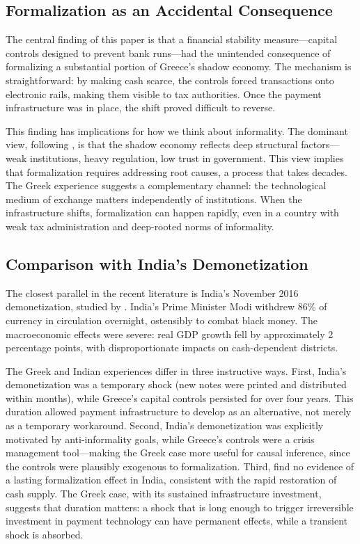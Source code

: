 \documentclass[12pt]{article}
\begin{document}
\subsection{Formalization as an Accidental Consequence}

The central finding of this paper is that a financial stability measure---capital controls designed to prevent bank runs---had the unintended consequence of formalizing a substantial portion of Greece's shadow economy. The mechanism is straightforward: by making cash scarce, the controls forced transactions onto electronic rails, making them visible to tax authorities. Once the payment infrastructure was in place, the shift proved difficult to reverse.

This finding has implications for how we think about informality. The dominant view, following \citet{laporta2014informality}, is that the shadow economy reflects deep structural factors---weak institutions, heavy regulation, low trust in government. This view implies that formalization requires addressing root causes, a process that takes decades. The Greek experience suggests a complementary channel: the technological medium of exchange matters independently of institutions. When the infrastructure shifts, formalization can happen rapidly, even in a country with weak tax administration and deep-rooted norms of informality.

\subsection{Comparison with India's Demonetization}

The closest parallel in the recent literature is India's November 2016 demonetization, studied by \citet{chodorowreich2019cash}. India's Prime Minister Modi withdrew 86\% of currency in circulation overnight, ostensibly to combat black money. The macroeconomic effects were severe: real GDP growth fell by approximately 2 percentage points, with disproportionate impacts on cash-dependent districts.

The Greek and Indian experiences differ in three instructive ways. First, India's demonetization was a temporary shock (new notes were printed and distributed within months), while Greece's capital controls persisted for over four years. This duration allowed payment infrastructure to develop as an alternative, not merely as a temporary workaround. Second, India's demonetization was explicitly motivated by anti-informality goals, while Greece's controls were a crisis management tool---making the Greek case more useful for causal inference, since the controls were plausibly exogenous to formalization. Third, \citet{chodorowreich2019cash} find no evidence of a lasting formalization effect in India, consistent with the rapid restoration of cash supply. The Greek case, with its sustained infrastructure investment, suggests that duration matters: a shock that is long enough to trigger irreversible investment in payment technology can have permanent effects, while a transient shock is absorbed.
\end{document}
